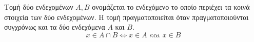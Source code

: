 Τομή δύο ενδεχομένων $ A,B $ ονομάζεται το ενδεχόμενο το οποίο περιέχει τα κοινά στοιχεία των δύο ενδεχομένων. Η τομή πραγματοποιείται όταν πραγματοποιούνται συγχρόνως και τα δύο ενδεχόμενα $ A $ και $ B $. \[ x\in A\cap B\Leftrightarrow x\in A \textrm{ και }x\in B \]
